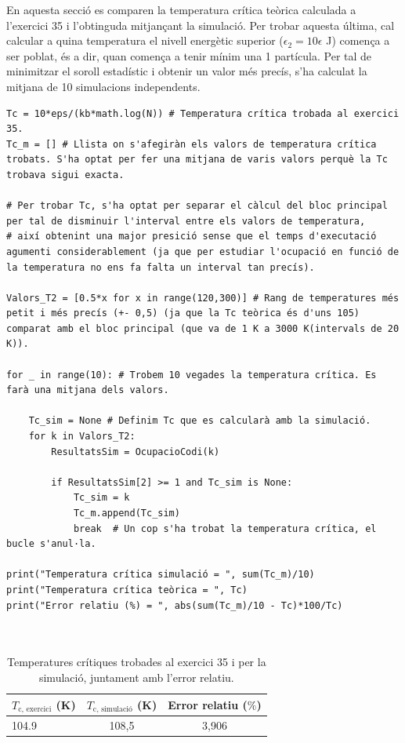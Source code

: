 \documentclass[a4paper,10.5pt]{report}
\begin{document}
En aquesta secció es comparen la temperatura crítica teòrica calculada a l'exercici 35 i l'obtinguda mitjançant la simulació. Per trobar aquesta última, cal calcular a quina temperatura el nivell energètic superior ($\epsilon_2 = 10\epsilon$ J) comença a ser poblat, és a dir, quan comença a tenir mínim una 1 partícula. Per tal de minimitzar el soroll estadístic i obtenir un valor més precís, s'ha calculat la mitjana de 10 simulacions independents.

\begin{lstlisting}[caption={Temperatura crítica.}]
Tc = 10*eps/(kb*math.log(N)) # Temperatura crítica trobada al exercici 35. 
Tc_m = [] # Llista on s'afegiràn els valors de temperatura crítica trobats. S'ha optat per fer una mitjana de varis valors perquè la Tc trobava sigui exacta. 

# Per trobar Tc, s'ha optat per separar el càlcul del bloc principal per tal de disminuir l'interval entre els valors de temperatura, 
# així obtenint una major presició sense que el temps d'executació agumenti considerablement (ja que per estudiar l'ocupació en funció de la temperatura no ens fa falta un interval tan precís).

Valors_T2 = [0.5*x for x in range(120,300)] # Rang de temperatures més petit i més precís (+- 0,5) (ja que la Tc teòrica és d'uns 105) comparat amb el bloc principal (que va de 1 K a 3000 K(intervals de 20 K)).

for _ in range(10): # Trobem 10 vegades la temperatura crítica. Es farà una mitjana dels valors. 

	Tc_sim = None # Definim Tc que es calcularà amb la simulació.
	for k in Valors_T2:
		ResultatsSim = OcupacioCodi(k)

		if ResultatsSim[2] >= 1 and Tc_sim is None: 
			Tc_sim = k
			Tc_m.append(Tc_sim)
			break  # Un cop s'ha trobat la temperatura crítica, el bucle s'anul·la. 

print("Temperatura crítica simulació = ", sum(Tc_m)/10)
print("Temperatura crítica teòrica = ", Tc)
print("Error relatiu (%) = ", abs(sum(Tc_m)/10 - Tc)*100/Tc)
	
	
\end{lstlisting}

\begin{table}[H]
	\centering
	\small
	\renewcommand{\arraystretch}{1.2}
	\caption{Temperatures crítiques trobades al exercici 35 i per la simulació, juntament amb l'error relatiu. }
	\begin{tabular}{lcc}
		\toprule
		$T_{\text{c, exercici}}$ (K) & $T_{\text{c, simulació}}$ (K) & Error relatiu ($\%$)  \\
		\midrule
		104.9 & 108,5  & 3,906 \\
		\bottomrule
	\end{tabular}
	\label{tab:3.2}
\end{table}
\end{document}
